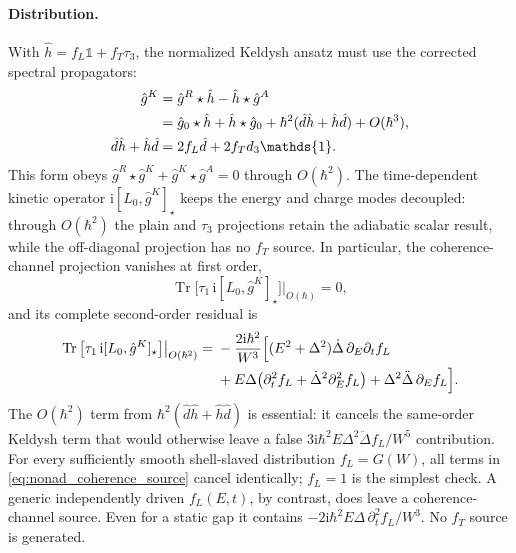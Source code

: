 \documentclass[
  aps,
  prb,
  preprint,
  superscriptaddress,
  longbibliography,
  nofootinbib
]{revtex4-2}
\newcommand{\ii}{\mathrm{i}}
\newcommand{\Tr}{\operatorname{Tr}}
\newcommand{\fL}{f_L}
\newcommand{\fT}{f_T}
\providecommand{\openone}{}\renewcommand{\openone}{\mathds{1}}
\begin{document}
\paragraph{Distribution.} With
\(\hat h=\fL\openone+\fT\tau_3\), the normalized Keldysh ansatz must use the
corrected spectral propagators:
\begin{align}
  \hat g^K
  &=\hat g^R\star\hat h-\hat h\star\hat g^A \notag\\
  &=\hat g_0\star\hat h+\hat h\star\hat g_0
    +\hbar^2(\hat d\hat h+\hat h\hat d)+O(\hbar^3),
  \label{eq:nonad_keldysh_correction}\\
  \hat d\hat h+\hat h\hat d
  &=2\fL\hat d+2\fT d_3\openone.
  \label{eq:nonad_keldysh_modes}
\end{align}
This form obeys
\(\hat g^R\star\hat g^K+\hat g^K\star\hat g^A=0\) through
\(O(\hbar^2)\). The time-dependent kinetic operator
\(\ii[L_0,\hat g^K]_\star\) keeps the energy and charge modes decoupled:
through \(O(\hbar^2)\) the plain and \(\tau_3\) projections retain the
adiabatic scalar result, while the off-diagonal projection has no \(\fT\)
source. In particular, the coherence-channel projection vanishes at first
order,
\begin{equation}
  \Tr\big[\tau_1\,\ii[L_0,\hat g^K]_\star\big]\Big|_{O(\hbar)}=0,
  \label{eq:nonad_coherence}
\end{equation}
and its complete second-order residual is
\begin{align}
  \left.\Tr\big[\tau_1\,\ii[L_0,\hat g^K]_\star\big]\right|_{O(\hbar^2)}
  ={}&-\frac{2\ii\hbar^2}{W^3}\Big[
    (E^2+\Delta^2)\dot\Delta\,\partial_E\partial_t\fL \notag\\
  &+E\Delta\big(\partial_t^2\fL
                 +\dot\Delta^2\partial_E^2\fL\big)
    +\Delta^2\ddot\Delta\,\partial_E\fL\Big].
  \label{eq:nonad_coherence_source}
\end{align}
The \(O(\hbar^2)\) term from
\(\hbar^2(\hat d\hat h+\hat h\hat d)\) is essential: it cancels the
same-order Keldysh term that would otherwise leave a false
\(3\ii\hbar^2 E\Delta^2\ddot\Delta\fL/W^5\) contribution. For every sufficiently smooth
shell-slaved distribution \(\fL=G(W)\), all terms in
\cref{eq:nonad_coherence_source} cancel identically; \(\fL=1\) is the
simplest check. A generic independently driven \(\fL(E,t)\), by contrast,
does leave a coherence-channel source. Even for a static gap it contains
\(-2\ii\hbar^2E\Delta\,\partial_t^2\fL/W^3\). No \(\fT\) source is generated.
\end{document}
